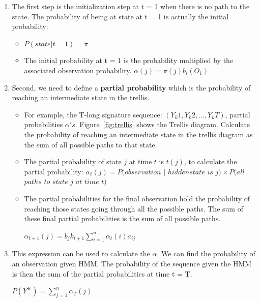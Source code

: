 \begin{enumerate}
\item The first step is the initialization step at t = 1 when there is no path to the state. The probability of being at state at t = 1 is actually the initial probability:
\begin{itemize}
 \item $P (state | t = 1) = \pi $
\item The initial probability at t = 1 is the probability multiplied by the associated observation probability.
$\alpha(j) = \pi(j) b_i (O_1)$
\end{itemize}
\item Second, we need to define a \textbf{partial probability} which is the probability of reaching an intermediate state in the trellis.
\begin{itemize}
\item For example, the T-long signature sequence: $(Y_k1, Y_k2,..., Y_kT)$, partial probabilities $\alpha 's$. Figure~\ref{fig:trellis} shows the Trellis diagram. Calculate the probability of reaching an intermediate state in the trellis diagram as the sum of all possible paths to that state.
\item The partial probability of state $j$ at time $t$ is $t(j)$, to calculate the partial probability:
$\alpha_t(j) = P (observation $ $ | $ $ hidden state $ $ is $ $ j) \times P (all $ $ paths $ $ to $ $ state  $ $ j $ $ at $ $ time $ $ t)$
\item The partial probabilities for the final observation hold the probability of reaching those states going through all the possible paths. The sum of these final partial probabilities is the sum of all possible paths. 
\hspace {4.5 cm}

$\alpha_{t+1}(j) = b_jk_{t+1} \sum\limits^{n}_{i = 1} \alpha_t(i) a_{ij}$

\end{itemize}
\item This expression can be used to calculate the $\alpha$. We can find the probability of an observation given HMM. The probability of the sequence given the HMM is then the sum of the partial probabilities at time t = T.
 
 \hspace {4.5 cm}$P(Y^K) = \sum\limits^{n}_{j=1} \alpha_T (j)$
\end{enumerate}

